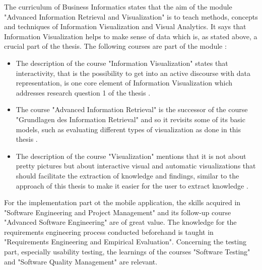 \documentclass[12pt,a4paper,titlepage,oneside]{article}
\begin{document}
The curriculum of Business Informatics \cite{studienplan2013Online} states that the aim of the module "Advanced Information Retrieval and Visualization" is to teach methods, concepts and techniques of Information Visualization and Visual Analytics. It says that Information Visualization helps to make sense of data which is, as stated above, a crucial part of the thesis. The following courses are part of the module \cite{studienplan2013Online}:
\begin{itemize}
	\item The description of the course "Information Visualization" states that interactivity, that is the possibility to get into an active discourse with data representation, is one core element of Information Visualization which addresses research question 1 of the thesis \cite{studienplan2013Online}.
	\item The course "Advanced Information Retrieval" is the successor of the course "Grundlagen des Information Retrieval" and so it revisits some of its basic models, such as evaluating different types of visualization as done in this thesis \cite{studienplan2013Online}.
	\item The description of the course "Visualization" mentions that it is not about pretty pictures but about interactive visual and automatic visualizations that should facilitate the extraction of knowledge and findings, similar to the approach of this thesis to make it easier for the user to extract knowledge \cite{studienplan2013Online}.
\end{itemize}

For the implementation part ot the mobile application, the skills acquired in "Software Engineering and Project Management" and its follow-up course "Advanced Software Engineering" are of great value. The knowledge for the requirements engineering process conducted beforehand is taught in "Requirements Engineering and Empirical Evaluation". Concerning the testing part, especially usability testing, the learnings of the courses "Software Testing" and "Software Quality Management" are relevant.






\printglossaries
\printindex
\end{document}
